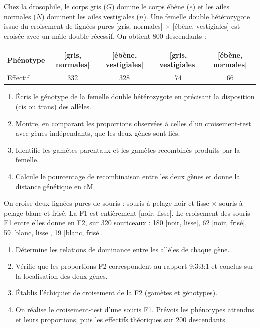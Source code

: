 \documentclass[11pt]{article}
\newcounter{popsec}
\newcounter{popsub}
\newcommand{\courssub}[1]{%
  \stepcounter{popsub}%
  \par\vspace{9pt}\noindent{\popxbold\fontsize{11.5}{13}\selectfont\color{popink}{\color{poporange}\thepopsec.\thepopsub}\hspace{6pt}#1}\par\nopagebreak\vspace{4pt}
}
\begin{document}
\courssub{Je m'entraîne}

\begin{exercice}
Chez la drosophile, le corps gris ($G$) domine le corps ébène ($e$) et les ailes normales ($N$) dominent les ailes vestigiales ($n$). Une femelle double hétérozygote issue du croisement de lignées pures [gris, normales] $\times$ [ébène, vestigiales] est croisée avec un mâle double récessif. On obtient 800 descendants :
\begin{center}
\begin{tabular}{|l|c|c|c|c|}
\hline
\rowcolor{popblueL} Phénotype & [gris, normales] & [ébène, vestigiales] & [gris, vestigiales] & [ébène, normales] \\
\hline
Effectif & 332 & 328 & 74 & 66 \\
\hline
\end{tabular}
\end{center}
\begin{enumerate}
\item Écris le génotype de la femelle double hétérozygote en précisant la disposition (cis ou trans) des allèles.
\item Montre, en comparant les proportions observées à celles d'un croisement-test avec gènes indépendants, que les deux gènes sont liés.
\item Identifie les gamètes parentaux et les gamètes recombinés produits par la femelle.
\item Calcule le pourcentage de recombinaison entre les deux gènes et donne la distance génétique en cM.
\end{enumerate}
\end{exercice}

\begin{exercice}
On croise deux lignées pures de souris : souris à pelage noir et lisse $\times$ souris à pelage blanc et frisé. La F1 est entièrement [noir, lisse]. Le croisement des souris F1 entre elles donne en F2, sur 320 souriceaux : 180 [noir, lisse], 62 [noir, frisé], 59 [blanc, lisse], 19 [blanc, frisé].
\begin{enumerate}
\item Détermine les relations de dominance entre les allèles de chaque gène.
\item Vérifie que les proportions F2 correspondent au rapport 9:3:3:1 et conclus sur la localisation des deux gènes.
\item Établis l'échiquier de croisement de la F2 (gamètes et génotypes).
\item On réalise le croisement-test d'une souris F1. Prévois les phénotypes attendus et leurs proportions, puis les effectifs théoriques sur 200 descendants.
\end{enumerate}
\end{exercice}
\end{document}
